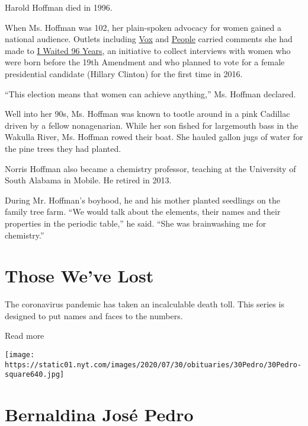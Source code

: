 Harold Hoffman died in 1996.

When Ms. Hoffman was 102, her plain-spoken advocacy for women gained a
national audience. Outlets including
\href{https://www.vox.com/policy-and-politics/2016/11/8/13562474/women-right-to-vote-96-years-hillary-clinton}{Vox}
and
\href{https://people.com/politics/i-waited-96-years-women-born-before-19th-amendment-vote-for-woman-president-hillary-clinton/}{People}
carried comments she had made to
\href{https://www.iwaited96years.com/}{I Waited 96 Years}, an initiative
to collect interviews with women who were born before the 19th Amendment
and who planned to vote for a female presidential candidate (Hillary
Clinton) for the first time in 2016.

``This election means that women can achieve anything,'' Ms. Hoffman
declared.

Well into her 90s, Ms. Hoffman was known to tootle around in a pink
Cadillac driven by a fellow nonagenarian. While her son fished for
largemouth bass in the Wakulla River, Ms. Hoffman rowed their boat. She
hauled gallon jugs of water for the pine trees they had planted.

Norris Hoffman also became a chemistry professor, teaching at the
University of South Alabama in Mobile. He retired in 2013.

During Mr. Hoffman's boyhood, he and his mother planted seedlings on the
family tree farm. ``We would talk about the elements, their names and
their properties in the periodic table,'' he said. ``She was
brainwashing me for chemistry.''

\href{https://www.nytimes.com/interactive/2020/obituaries/people-died-coronavirus-obituaries.html?action=click\&pgtype=Article\&state=default\&region=BELOW_MAIN_CONTENT\&context=covid_obits_promo}{}

\hypertarget{those-weve-lost}{%
\section{Those We've Lost}\label{those-weve-lost}}

The coronavirus pandemic has taken an incalculable death toll. This
series is designed to put names and faces to the numbers.

Read more

\texttt{[image: https://static01.nyt.com/images/2020/07/30/obituaries/30Pedro/30Pedro-square640.jpg]}

\hypertarget{bernaldina-josuxe9-pedro}{%
\section{Bernaldina José Pedro}\label{bernaldina-josuxe9-pedro}}

